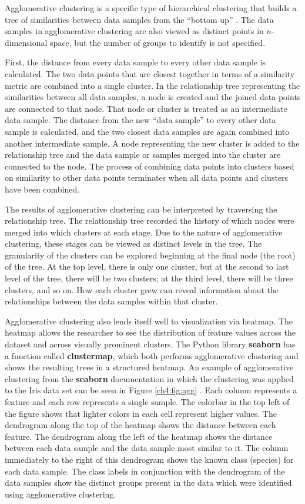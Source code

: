 Agglomerative clustering is a specific type of hierarchical clustering that builds a tree of similarities between data samples from the ``bottom up'' \cite{Ward1963}. The data samples in agglomerative clustering are also viewed as distinct points in $n$-dimensional space, but the number of groups to identify is not specified. 

First, the distance from every data sample to every other data sample is calculated. The two data points that are closest together in terms of a similarity metric are combined into a single cluster. In the relationship tree representing the similarities between all data samples, a node is created and the joined data points are connected to that node. That node or cluster is treated as an intermediate data sample. The distance from the new ``data sample'' to every other data sample is calculated, and the two closest data samples are again combined into another intermediate sample. A node representing the new cluster is added to the relationship tree and the data sample or samples merged into the cluster are connected to the node. The process of combining data points into clusters based on similarity to other data points terminates when all data points and clusters have been combined. 

The results of agglomerative clustering can be interpreted by traversing the relationship tree. The relationship tree recorded the history of which nodes were merged into which clusters at each stage. Due to the nature of agglomerative clustering, these stages can be viewed as distinct levels in the tree. The granularity of the clusters can be explored beginning at the final node (the root) of the tree. At the top level, there is only one cluster, but at the second to last level of the tree, there will be two clusters; at the third level, there will be three clusters, and so on. How each cluster grew can reveal information about the relationships between the data samples within that cluster.

Agglomerative clustering also lends itself well to visualization via heatmap. The heatmap allows the researcher to see the distribution of feature values across the dataset and across visually prominent clusters. The Python library \textbf{seaborn} has a function called \textbf{clustermap}, which both performs agglomerative clustering and shows the resulting trees in a structured heatmap. An example of agglomerative clustering from the \textbf{seaborn} documentation in which the clustering was applied to the Iris data set can be seen in  Figure \ref{ch4:fig:agg} \cite{Waskom2018}. Each column represents a feature and each row represents a single sample. The colorbar in the top left of the figure shows that lighter colors in each cell represent higher values. The dendrogram along the top of the heatmap shows the distance between each feature. The dendrogram along the left of the heatmap shows the distance between each data sample and the data sample most similar to it. The column immediately to the right of this dendrogram shows the known class (species) for each data sample. The class labels in conjunction with the dendrogram of the data samples show the distinct groups present in the data which were identified using agglomerative clustering. 

